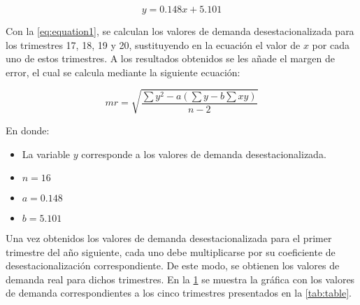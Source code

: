 \begin{equation}
  y = 0.148x + 5.101
  \label{eq:equation1}
\end{equation}

Con la \cref{eq:equation1}, se calculan los valores de demanda 
desestacionalizada para los trimestres 17, 18, 19 y 20, sustituyendo en la 
ecuación el valor de $x$ por cada uno de estos trimestres. A los resultados 
obtenidos se les añade el margen de error, el cual se calcula mediante la 
siguiente ecuación:

\begin{equation*}
  mr = \sqrt{\frac{\sum y^2 - a(\sum y - b\sum xy)}{n-2}}
\end{equation*}

En donde:
\begin{itemize}
  \item La variable $y$ corresponde a los valores de demanda desestacionalizada.
  \item $n = 16$
  \item $a = 0.148$
  \item $b = 5.101$
\end{itemize}

Una vez obtenidos los valores de demanda desestacionalizada para el primer 
trimestre del año siguiente, cada uno debe multiplicarse por su coeficiente de 
desestacionalización correspondiente. De este modo, se obtienen los valores de 
demanda real para dichos trimestres. En la \cref{fig:graphic2} se muestra la 
gráfica con los valores de demanda correspondientes a los cinco trimestres 
presentados en la \cref{tab:table}.

\begin{figure}[H]
  \centering
  \label{fig:graphic2}
\end{figure}

